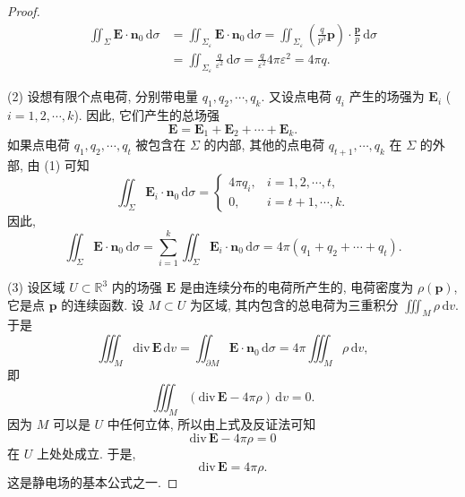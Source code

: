 \begin{proof}
\[
\begin{aligned}
\iint_{\Sigma}\boldsymbol{E}\cdot\boldsymbol{n}_{0}\,\mathrm{d}\sigma&=\iint_{\Sigma_{\varepsilon}}\boldsymbol{E}\cdot\boldsymbol{n}_{0}\,\mathrm{d}\sigma=\iint_{\Sigma_{\varepsilon}}\left(\frac{q}{p^{3}}\boldsymbol{p}\right)\cdot\frac{\boldsymbol{p}}{p}\,\mathrm{d}\sigma\\
&=\iint_{\Sigma_{\varepsilon}}\frac{q}{\varepsilon^{2}}\,\mathrm{d}\sigma=\frac{q}{\varepsilon^{2}}4\pi\varepsilon^{2}=4\pi q.
\end{aligned}
\]

(2) 设想有限个点电荷, 分别带电量 $q_{1},q_{2},\cdots,q_{k}$. 又设点电荷 $q_{i}$ 产生的场强为 $\boldsymbol{E}_{i}$ ($i=1,2,\cdots,k$). 因此, 它们产生的总场强
\[
\boldsymbol{E}=\boldsymbol{E}_{1}+\boldsymbol{E}_{2}+\cdots+\boldsymbol{E}_{k}.
\]
如果点电荷 $q_{1},q_{2},\cdots,q_{t}$ 被包含在 $\Sigma$ 的内部, 其他的点电荷 $q_{t+1},\cdots,q_{k}$ 在 $\Sigma$ 的外部, 由 (1) 可知
\[
\iint_{\Sigma}\boldsymbol{E}_{i}\cdot\boldsymbol{n}_{0}\,\mathrm{d}\sigma=\begin{cases}
4\pi q_{i}, & i=1,2,\cdots,t,\\
0, & i=t+1,\cdots,k.
\end{cases}
\]
因此,
\[
\iint_{\Sigma}\boldsymbol{E}\cdot\boldsymbol{n}_{0}\,\mathrm{d}\sigma=\sum_{i=1}^{k}\iint_{\Sigma}\boldsymbol{E}_{i}\cdot\boldsymbol{n}_{0}\,\mathrm{d}\sigma=4\pi(q_{1}+q_{2}+\cdots+q_{t}).
\]

(3) 设区域 $U\subset\mathbb{R}^{3}$ 内的场强 $\boldsymbol{E}$ 是由连续分布的电荷所产生的, 电荷密度为 $\rho(\boldsymbol{p})$, 它是点 $\boldsymbol{p}$ 的连续函数. 设 $M\subset U$ 为区域, 其内包含的总电荷为三重积分 $\iiint_{M}\rho\,\mathrm{d}v$. 于是
\[
\iiint_{M}\mathrm{div}\,\boldsymbol{E}\,\mathrm{d}v=\iint_{\partial M}\boldsymbol{E}\cdot\boldsymbol{n}_{0}\,\mathrm{d}\sigma=4\pi\iiint_{M}\rho\,\mathrm{d}v,
\]
即
\[
\iiint_{M}(\mathrm{div}\,\boldsymbol{E}-4\pi\rho)\,\mathrm{d}v=0.
\]
因为 $M$ 可以是 $U$ 中任何立体, 所以由上式及反证法可知
\[
\mathrm{div}\,\boldsymbol{E}-4\pi\rho=0
\]
在 $U$ 上处处成立. 于是,
\[
\mathrm{div}\,\boldsymbol{E}=4\pi\rho.
\]
这是静电场的基本公式之一.
\end{proof}

